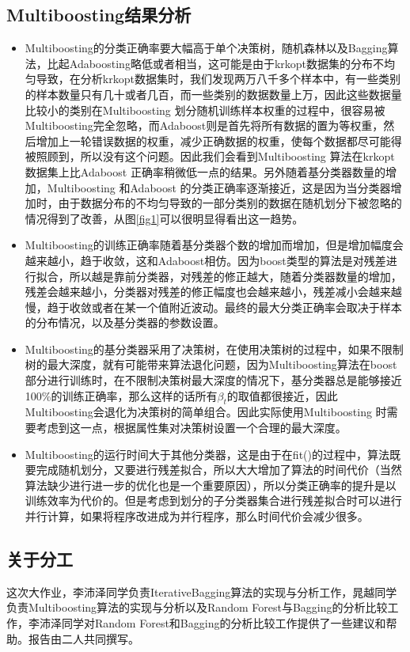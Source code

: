 \documentclass[a4paper,oneside,12pt]{article}
\begin{document}
\begin{spacing}{1.5}
\subsection{Multiboosting结果分析}
\begin{itemize}
  \item Multiboosting的分类正确率要大幅高于单个决策树，随机森林以及Bagging算法，比起Adaboosting略低或者相当，这可能是由于krkopt数据集的分布不均匀导致，在分析krkopt数据集时，我们发现两万八千多个样本中，有一些类别的样本数量只有几十或者几百，而一些类别的数据数量上万，因此这些数据量比较小的类别在Multiboosting 划分随机训练样本权重的过程中，很容易被Multiboosting完全忽略，而Adaboost则是首先将所有数据的置为等权重，然后增加上一轮错误数据的权重，减少正确数据的权重，使每个数据都尽可能得被照顾到，所以没有这个问题。因此我们会看到Multiboosting 算法在krkopt 数据集上比Adaboost 正确率稍微低一点的结果。另外随着基分类器数量的增加，Multiboosting 和Adaboost 的分类正确率逐渐接近，这是因为当分类器增加时，由于数据分布的不均匀导致的一部分类别的数据在随机划分下被忽略的情况得到了改善，从图\ref{fig1}可以很明显得看出这一趋势。
  \item Multiboosting的训练正确率随着基分类器个数的增加而增加，但是增加幅度会越来越小，趋于收敛，这和Adaboost相仿。因为boost类型的算法是对残差进行拟合，所以越是靠前分类器，对残差的修正越大，随着分类器数量的增加，残差会越来越小，分类器对残差的修正幅度也会越来越小，残差减小会越来越慢，趋于收敛或者在某一个值附近波动。最终的最大分类正确率会取决于样本的分布情况，以及基分类器的参数设置。
  \item Multiboosting的基分类器采用了决策树，在使用决策树的过程中，如果不限制树的最大深度，就有可能带来算法退化问题，因为Multiboosting算法在boost部分进行训练时，在不限制决策树最大深度的情况下，基分类器总是能够接近100\%的训练正确率，那么这样的话所有$\beta _t$的取值都很接近，因此Multiboosting会退化为决策树的简单组合。因此实际使用Multiboosting 时需要考虑到这一点，根据属性集对决策树设置一个合理的最大深度。
  \item Multiboosting的运行时间大于其他分类器，这是由于在fit()的过程中，算法既要完成随机划分，又要进行残差拟合，所以大大增加了算法的时间代价（当然算法缺少进行进一步的优化也是一个重要原因），所以分类正确率的提升是以训练效率为代价的。但是考虑到划分的子分类器集合进行残差拟合时可以进行并行计算，如果将程序改进成为并行程序，那么时间代价会减少很多。
\end{itemize}


\begin{appendix}

\section{关于分工}
这次大作业，李沛泽同学负责IterativeBagging算法的实现与分析工作，晁越同学负责Multiboosting算法的实现与分析以及Random Forest与Bagging的分析比较工作，李沛泽同学对Random Forest和Bagging的分析比较工作提供了一些建议和帮助。报告由二人共同撰写。

\end{appendix}
\end{spacing}
\end{document}
